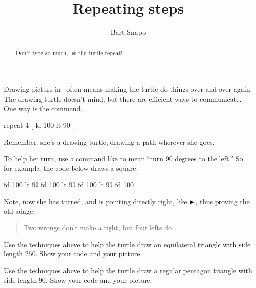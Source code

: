 \documentclass[noauthor,nooutcomes,12pt]{ximera}
\title{Repeating steps}
\author{Bart Snapp}
\begin{document}
\begin{abstract}
  Don't type so much, let the turtle repeat!
\end{abstract}
\maketitle

\nameblankgen

\begin{multicols}{2}
  Drawing picturs in \LOGO\ often means making the turtle do things
  over and over again. The drawing-turtle doesn't mind, but there are
  efficient ways to communicate. One way is the  command.
\begin{logo}
repeat 4 [
  fd 100
  lt 90
  ]
\end{logo}

Remember, she's a drawing turtle, drawing a path wherever she goes.

To help her turn, use a command like  to mean ``turn $90$
degrees to the left.'' So for example, the code below draws a square:

\begin{logo}
fd 100
lt 90
fd 100
lt 90
fd 100
lt 90
fd 100
\end{logo}
\begin{logoout}
\end{logoout}

Note, now she has turned, and is pointing directly right, like
$\text{$\blacktriangleright$}$, thus proving the old adage,
\begin{quote}
  Two wrongs don't make a right, but four lefts do.
\end{quote}
\end{multicols}

\newpage

\begin{problem}
  Use the techniques above to help the turtle draw an equilateral
  triangle with side length $250$. Show your code and your picture.
\end{problem}

\newpage

\begin{problem}
  Use the techniques above to help the turtle draw a regular pentagon
  triangle with side length $90$. Show your code and your picture. 
\end{problem}
\end{document}
